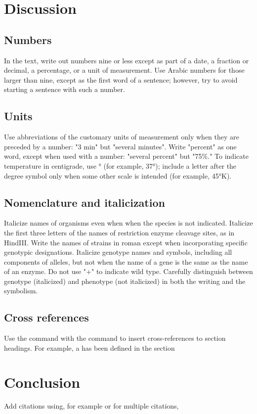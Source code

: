 {\begin{multicols}{2}
    \section{Discussion}
    \subsection{Numbers} In the text, write out  numbers nine or less except as part of a date, a fraction or decimal, a percentage, or a unit of measurement. Use Arabic numbers for those larger than nine, except as the first word of a sentence; however, try to avoid starting a sentence with such a number.
    
    \subsection{Units} Use abbreviations of the customary units of measurement only when they are preceded by a number: "3 min" but "several minutes". Write "percent" as one word, except when used with a number: "several percent" but "75\%." To indicate temperature in centigrade, use ° (for example, 37°); include a letter after the degree symbol only when some other scale is intended (for example, 45°K).
    
    \subsection{Nomenclature  and italicization} Italicize  names of organisms even when  when the species is not indicated.  Italicize the first three letters of the names of restriction enzyme cleavage sites, as in HindIII. Write the names of strains in roman except when incorporating specific genotypic designations. Italicize genotype names and symbols, including all components of alleles, but not when the name of a gene is the same as the name of an enzyme. Do not use "+" to indicate wild type. Carefully distinguish between genotype (italicized) and phenotype (not italicized) in both the writing and the symbolism.
    
    \subsection{Cross references}
    Use the  command with the command to insert cross-references to section headings. For example, a has been defined in the section 
    
    \section{Conclusion}
    Add citations using, for example \citep{neher2013genealogies} or for multiple citations, \citealt{rodelsperger2014characterization,neher2013genealogies,Falush16}  \citep{neher2013genealogies}
    

\end{multicols}}

